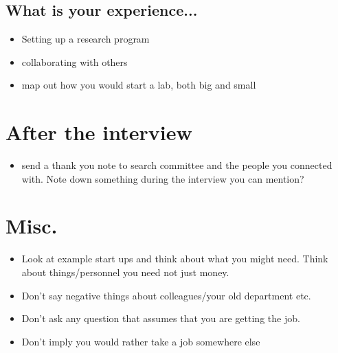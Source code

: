 \documentclass[12pt]{article}
\begin{document}
\subsection{What is your experience...}
\begin{itemize}
\item Setting up a research program
\item collaborating with others
\item map out how you would start a lab, both big and small
\end{itemize}

\section{After the interview}
\begin{itemize}
\item send a thank you note to search committee and the people you
  connected with. Note down something during the interview you can
  mention?
\end{itemize}

\section{Misc.}
\begin{itemize}
\item Look at example start ups and think about what you might
  need. Think about things/personnel you need not just money.
\item Don't say negative things about colleagues/your old department etc.
\item Don't ask any question that assumes that you are getting the
  job.
\item Don't imply you would rather take a job somewhere else 
\end{itemize}
\end{document}
